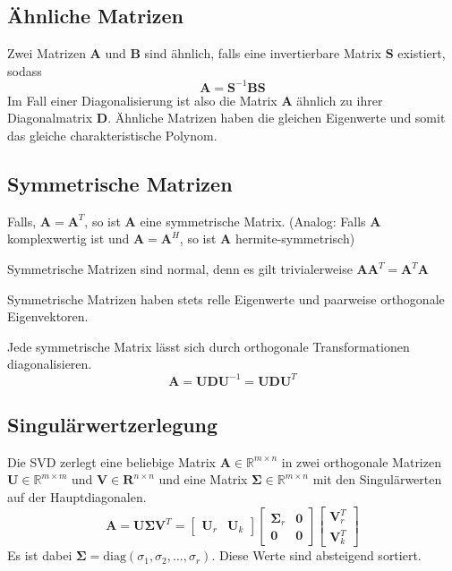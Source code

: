 \documentclass[11pt]{article}
\begin{document}
\subsection*{Ähnliche Matrizen}
\vspace*{-0.5cm}
Zwei Matrizen $\mathbf{A}$ und $\mathbf{B}$ sind ähnlich, falls eine invertierbare Matrix $\mathbf{S}$ existiert, sodass
$$\mathbf{A} = \mathbf{S}^{-1} \mathbf{BS}$$
Im Fall einer Diagonalisierung ist also die Matrix $\mathbf{A}$ ähnlich zu ihrer Diagonalmatrix $\mathbf{D}$. Ähnliche Matrizen haben die gleichen Eigenwerte und somit das gleiche charakteristische Polynom.

\subsection*{Symmetrische Matrizen}
\vspace*{-0.5cm}
Falls, $\mathbf{A} = \mathbf{A}^T$, so ist $\mathbf{A}$ eine symmetrische Matrix. (Analog: Falls $\mathbf{A}$ komplexwertig ist und $\mathbf{A} = \mathbf{A}^H$, so ist $\mathbf{A}$ hermite-symmetrisch)

Symmetrische Matrizen sind normal, denn es gilt trivialerweise $\mathbf{AA}^T = \mathbf{A}^T \mathbf{A}$

Symmetrische Matrizen haben stets relle Eigenwerte und paarweise orthogonale Eigenvektoren.

Jede symmetrische Matrix lässt sich durch orthogonale Transformationen diagonalisieren.
$$\mathbf{A} = \mathbf{UDU}^{-1} = \mathbf{UDU}^T$$

\subsection*{Singulärwertzerlegung}
\vspace*{-0.5cm}
Die SVD zerlegt eine beliebige Matrix $\mathbf{A} \in \mathbb{R}^{m\times n}$ in zwei orthogonale Matrizen $\mathbf{U} \in \mathbb{R}^{m\times m}$ und $\mathbf{V} \in \mathbf{R}^{n\times n}$ und eine Matrix $\mathbf{\Sigma} \in \mathbb{R}^{m \times n}$ mit den Singulärwerten auf der Hauptdiagonalen.
$$\mathbf{A} = \mathbf{U\Sigma V}^T = \begin{bmatrix}
    \mathbf{U}_r & \mathbf{U}_k
\end{bmatrix} \begin{bmatrix}
    \mathbf{\Sigma}_r & \mathbf{0} \\
    \mathbf{0} & \mathbf{0}
\end{bmatrix} \begin{bmatrix}
    \mathbf{V}_r^T \\
    \mathbf{V}_k^T
\end{bmatrix}$$
Es ist dabei $\mathbf{\Sigma} = \text{diag}(\sigma_1, \sigma_2, \dots,\sigma_r )$. Diese Werte sind absteigend sortiert.
\end{document}
